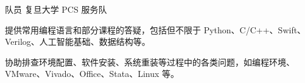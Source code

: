 

\begin{cventries}

  \cventry
  {队员} %
  {复旦大学 PCS 服务队} %
  {} %
  {} %
  {
    \begin{cvitems} %
      \item {提供常用编程语言和部分课程的答疑，包括但不限于 Python、C/C++、Swift、Verilog、人工智能基础、数据结构等。}
      \item {协助排查环境配置、软件安装、系统重装等过程中的各类问题，如编程环境、VMware、Vivado、Office、Stata、Linux 等。}
    \end{cvitems}
  }

\end{cventries}
